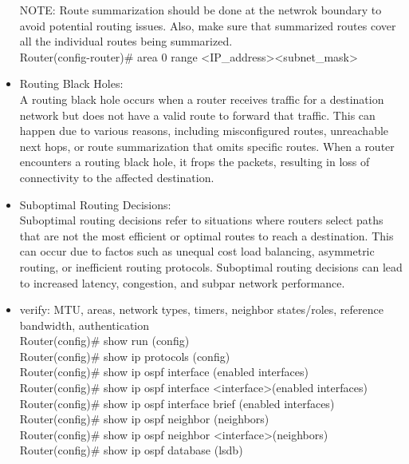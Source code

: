 \documentclass{article}
\begin{document}
\begin{itemize}
  		NOTE: Route summarization should be done at the netwrok boundary to avoid potential routing issues. Also, make sure that summarized routes cover all the individual routes being summarized.\\
  		Router(config-router)\# area 0 range \textless IP\_address\textgreater \textless subnet\_mask\textgreater
  	\item[] Routing Black Holes:\\
  		A routing black hole occurs when a router receives traffic for a destination network but does not have a valid route to forward that traffic. This can happen due to various reasons, including misconfigured routes, unreachable next hops, or route summarization that omits specific routes. When a router encounters a routing black hole, it frops the packets, resulting in loss of connectivity to the affected destination.
  	\item[] Suboptimal Routing Decisions:\\
  		Suboptimal routing decisions refer to situations where routers select paths that are not the most efficient or optimal routes to reach a destination. This can occur due to factos such as unequal cost load balancing, asymmetric routing, or inefficient routing protocols. Suboptimal routing decisions can lead to increased latency, congestion, and subpar network performance.
  		
  	\item[] verify: MTU, areas, network types, timers, neighbor states/roles, reference bandwidth, authentication\\
  		Router(config)\# show run (config)\\
  		Router(config)\# show ip protocols (config)\\
  		
  		Router(config)\# show ip ospf interface (enabled interfaces)\\
  		Router(config)\# show ip ospf interface \textless interface\textgreater (enabled interfaces)\\
  		Router(config)\# show ip ospf interface brief (enabled interfaces)\\
  		
  		Router(config)\# show ip ospf neighbor (neighbors)\\
  		Router(config)\# show ip ospf neighbor \textless interface\textgreater (neighbors)\\
  		
  		Router(config)\# show ip ospf database (lsdb)\\
  		

\end{itemize}
\end{document}

